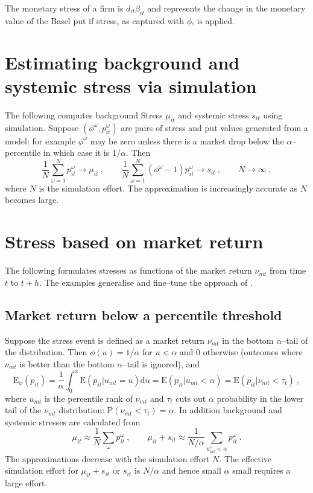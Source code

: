 \documentclass[authoryear]{elsarticle}
\newcommand{\E}{\mathrm{E}}
\newcommand{\p}{\mathrm{P}}
\renewcommand{\o}{\omega}
\newcommand{\Es}{\E_\phi}
\newcommand{\de}{\mathrm{d}}
\newcommand{\cq}{\ , \qquad}
\newcommand{\be}[1]{\begin{equation}\label{#1}}
\newcommand{\ee}{\end{equation}}
\begin{document}
The  monetary stress of a firm is
$
d_{it}\beta_{it}
$
and represents the change in the monetary value of the Basel put  if stress, as captured with $\phi$, is applied.

\section{Estimating background and systemic stress via simulation}\label{estimate}

The following computes background Stress $\mu_{it}$ and systemic stress $s_{it}$ using simulation.   Suppose $(\phi^\o,p_{it}^\o)$ are pairs of stress and put values generated from a model: for example $\phi^\o$ may be zero unless there is a market drop below the $\alpha$--percentile in which case it is $1/\alpha$.
Then
\be{simulate}
\frac{1}{N}\sum_{\o=1}^N p_{it}^\o\rightarrow \mu_{it}\cq \frac{1}{N}\sum_{\o=1}^N (\phi^\o-1)p_{it}^\o\rightarrow s_{it} \cq N\rightarrow\infty\ ,
\ee
where $N$ is the simulation effort.  The approximation is increasingly accurate as $N$ becomes large.





\section{Stress based on  market return}\label{marketstress}


The following formulates stresses as functions of the market return $\nu_{mt}$ from time $t$ to $t+h$. The examples generalise and fine--tune the approach of \cite{brownlees2015}.

\subsection{Market return below a percentile threshold}

Suppose the stress event is defined as a market return $\nu_{mt}$ in the bottom $\alpha$--tail of the distribution.   Then  $\phi(u)=1/\alpha$ for $u< \alpha$ and 0 otherwise (outcomes where $\nu_{mt}$ is better than the bottom $\alpha$--tail is ignored), and
$$
\Es(p_{it}) = \frac{1}{\alpha}\int_0^\alpha\E(p_{it}|u_{mt}=u)\de u = \E(p_{it}|u_{mt}<\alpha) = \E(p_{it}|\nu_{mt}<\tau_{t}) \ ,
$$
where $u_{mt}$ is the percentile rank of $\nu_{mt}$ and $\tau_t$ cuts out $\alpha$ probability in the lower tail of the $\nu_{mt}$ distribution: $\p(\nu_{mt}<\tau_t)=\alpha$. In addition background and systemic stresses are calculated from
$$
\mu_{it}\approx \frac{1}{N} \sum_\o p_{it}^\o \cq  \mu_{it}+s_{it}   \approx  \frac{1}{N/\alpha} \sum_{u^\o_{mt}<\alpha}  p_{it}^\o\ .
$$
The approximations decrease with the simulation effort $N$.   The effective simulation effort for $\mu_{it}+s_{it}$ or $s_{it}$ is $N/\alpha$ and hence small $\alpha$ small requires a large effort.
\end{document}
